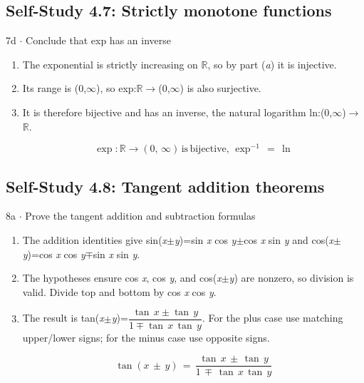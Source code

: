 \documentclass[11pt]{article}
\begin{document}
\begin{keepsection}\subsection{Self-Study 4.7: Strictly monotone functions}

\begin{workedbox}{7d \ensuremath{\cdot} Conclude that exp has an inverse}
\begin{enumerate}
\item The exponential is strictly increasing on \ensuremath{\mathbb{R}}, so by part (\textit{a}) it is injective.
\item Its range is (0,\ensuremath{\infty}), so exp:\ensuremath{\mathbb{R}}\ensuremath{\to}(0,\ensuremath{\infty}) is also surjective.
\item {}
It is therefore bijective and has an inverse, the natural logarithm ln:(0,\ensuremath{\infty})\ensuremath{\to}\ensuremath{\mathbb{R}}.

\begin{equation*}\exp :\mathbb{R}\to (0,\, \infty )\, \text{is}\, \text{bijective},\, \exp ^{-1}\, =\, \ln \end{equation*}
\end{enumerate}
\end{workedbox}

\end{keepsection}
\begin{keepsection}\subsection{Self-Study 4.8: Tangent addition theorems}

\begin{workedbox}{8a \ensuremath{\cdot} Prove the tangent addition and subtraction formulas}
\begin{enumerate}
\item The addition identities give sin(\textit{x}\ensuremath{\pm}\textit{y})=sin \textit{x} cos \textit{y}\ensuremath{\pm}cos \textit{x} sin \textit{y} and cos(\textit{x}\ensuremath{\pm}\textit{y})=cos \textit{x} cos \textit{y}\ensuremath{\mp}sin \textit{x} sin \textit{y}.
\item The hypotheses ensure cos \textit{x}, cos \textit{y}, and cos(\textit{x}\ensuremath{\pm}\textit{y}) are nonzero, so division is valid. Divide top and bottom by cos \textit{x} cos \textit{y}.
\item {}
The result is tan(\textit{x}\ensuremath{\pm}\textit{y})={\small\ensuremath{\dfrac{\tan \, {x}\pm \tan \, {y}}{1\mp \tan \, {x}\, \tan \, {y}}}}. For the plus case use matching upper/lower signs; for the minus case use opposite signs.

\begin{equation*}\tan ({x}\, \pm \, {y})\, =\, \dfrac{\tan \, {x}\, \pm \, \tan \, {y}}{1\, \mp \, \tan \, {x}\, \tan \, {y}}\end{equation*}
\end{enumerate}
\end{workedbox}

\end{keepsection}
\end{document}
